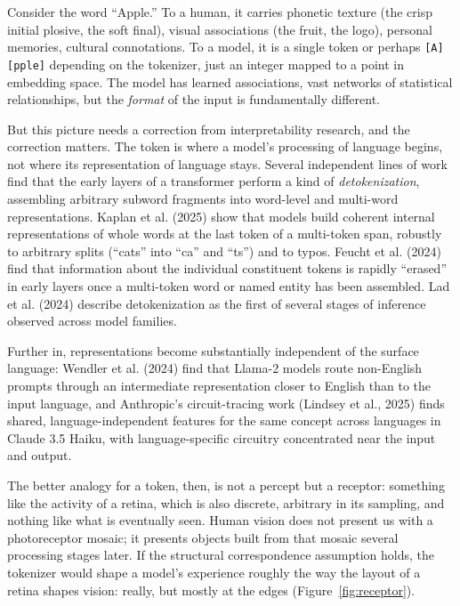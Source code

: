\documentclass[11pt,letterpaper]{article}
\begin{document}
Consider the word ``Apple.'' To a human, it carries phonetic texture (the crisp initial plosive, the soft final), visual associations (the fruit, the logo), personal memories, cultural connotations. To a model, it is a single token or perhaps \texttt{[A][pple]} depending on the tokenizer, just an integer mapped to a point in embedding space. The model has learned associations, vast networks of statistical relationships, but the \emph{format} of the input is fundamentally different.

But this picture needs a correction from interpretability research, and the correction matters. The token is where a model's processing of language begins, not where its representation of language stays. Several independent lines of work find that the early layers of a transformer perform a kind of \emph{detokenization}, assembling arbitrary subword fragments into word-level and multi-word representations. Kaplan et al. (2025) show that models build coherent internal representations of whole words at the last token of a multi-token span, robustly to arbitrary splits (``cats'' into ``ca'' and ``ts'') and to typos. Feucht et al. (2024) find that information about the individual constituent tokens is rapidly ``erased'' in early layers once a multi-token word or named entity has been assembled. Lad et al. (2024) describe detokenization as the first of several stages of inference observed across model families.

Further in, representations become substantially independent of the surface language: Wendler et al. (2024) find that Llama-2 models route non-English prompts through an intermediate representation closer to English than to the input language, and Anthropic's circuit-tracing work (Lindsey et al., 2025) finds shared, language-independent features for the same concept across languages in Claude 3.5 Haiku, with language-specific circuitry concentrated near the input and output.

The better analogy for a token, then, is not a percept but a receptor: something like the activity of a retina, which is also discrete, arbitrary in its sampling, and nothing like what is eventually seen. Human vision does not present us with a photoreceptor mosaic; it presents objects built from that mosaic several processing stages later. If the structural correspondence assumption holds, the tokenizer would shape a model's experience roughly the way the layout of a retina shapes vision: really, but mostly at the edges (Figure~\ref{fig:receptor}).
\end{document}
